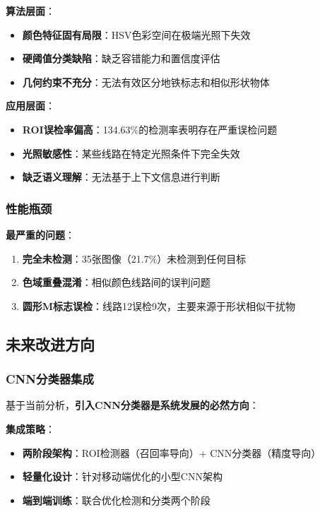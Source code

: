 \documentclass[12pt,a4paper]{article}
\begin{document}
\textbf{算法层面}：
\begin{itemize}
    \item \textbf{颜色特征固有局限}：HSV色彩空间在极端光照下失效
    \item \textbf{硬阈值分类缺陷}：缺乏容错能力和置信度评估
    \item \textbf{几何约束不充分}：无法有效区分地铁标志和相似形状物体
\end{itemize}

\textbf{应用层面}：
\begin{itemize}
    \item \textbf{ROI误检率偏高}：134.63\%的检测率表明存在严重误检问题
    \item \textbf{光照敏感性}：某些线路在特定光照条件下完全失效
    \item \textbf{缺乏语义理解}：无法基于上下文信息进行判断
\end{itemize}

\subsubsection{性能瓶颈}

\textbf{最严重的问题}：
\begin{enumerate}
    \item \textbf{完全未检测}：35张图像（21.7\%）未检测到任何目标
    \item \textbf{色域重叠混淆}：相似颜色线路间的误判问题
    \item \textbf{圆形M标志误检}：线路12误检9次，主要来源于形状相似干扰物
\end{enumerate}

\subsection{未来改进方向}

\subsubsection{CNN分类器集成}

基于当前分析，\textbf{引入CNN分类器是系统发展的必然方向}：

\textbf{集成策略}：
\begin{itemize}
    \item \textbf{两阶段架构}：ROI检测器（召回率导向）+ CNN分类器（精度导向）
    \item \textbf{轻量化设计}：针对移动端优化的小型CNN架构
    \item \textbf{端到端训练}：联合优化检测和分类两个阶段
\end{itemize}
\end{document}
